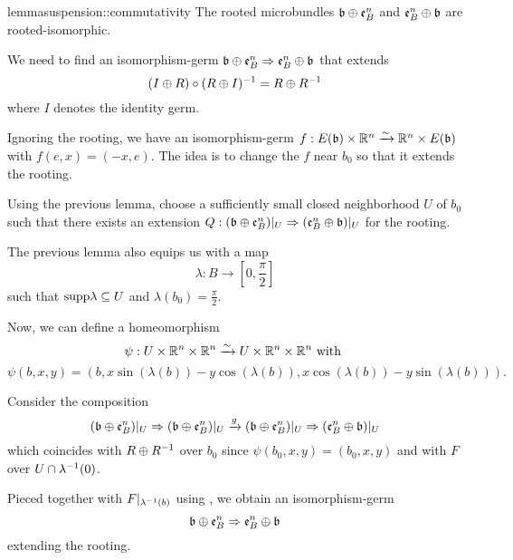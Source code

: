 \begin{mystatement}{lemma}{suspension::commutativity}
    The rooted microbundles $\whitney{\bb}{\be{B}}$ and $\whitney{\be{B}}{\bb}$ are rooted-isomorphic. 
\end{mystatement}

\begin{myproof}
    We need to find an isomorphism-germ
    $\germ{\whitney{\bb}{\be{B}}}{\whitney{\be{B}}{\bb}}$ that extends
    \[ (I \oplus{} R) \circ (R \oplus{} I)^{-1} = R \oplus{} R^{-1} \]
    where $I$ denotes the identity germ.

    Ignoring the rooting, we have an
    isomorphism-germ $f: E(\bb) \cross \R^n \isomto \R^n \cross E(\bb)$ with $f(e, x) = (-x, e)$.
    The idea is to change the $f$ near $b_0$ so that it extends the rooting.

    Using the previous lemma, choose a sufficiently small closed neighborhood $U$ of $b_0$
    such that there exists an extension
    $\germdef{Q}{(\whitney{\bb}{\be{B}})\restr{U}}{(\whitney{\be{B}}{\bb})\restr{U}}$ for the rooting.

    The previous lemma also equips us with a map
    \[ \lambda: B \to [0, \frac{\pi}{2}] \]
    such that $\text{supp} \lambda \subseteq{} U$ and $\lambda(b_0) = \frac{\pi}{2}$.
    
    Now, we can define a homeomorphism
    \[ \psi: U \times \mathbb{R}^n \times \mathbb{R}^n \xrightarrow{\sim} U \times \mathbb{R}^n \times \mathbb{R}^n \text{ with } \]
    \[ \psi(b, x, y) = (b, x \sin(\lambda(b)) - y \cos(\lambda(b)), x \cos(\lambda(b)) - y \sin(\lambda(b))). \]

    Consider the composition
    \[ \germ{(\whitney{\bb}{\be{B}})\restr{U}}{(\whitney{\bb}{\be{B}})\restr{U}} \xto{g} \germ{(\whitney{\bb}{\be{B}})\restr{U}}{(\whitney{\be{B}}{\bb})\restr{U}} \]
    which coincides with $R \oplus{} R^{-1}$ over $b_0$
    since $\psi(b_0, x, y) = (b_0, x, y)$ and with $F$ over $U \cap \lambda^{-1}(0)$.
    
    Pieced together with $F\vert_{\lambda^{-1}(b)}$ using ,
    we obtain an isomorphism-germ 
    \[ \germ{\whitney{\bb}{\be{B}}}{\whitney{\be{B}}{\bb}} \]
    extending the rooting.
\end{myproof}